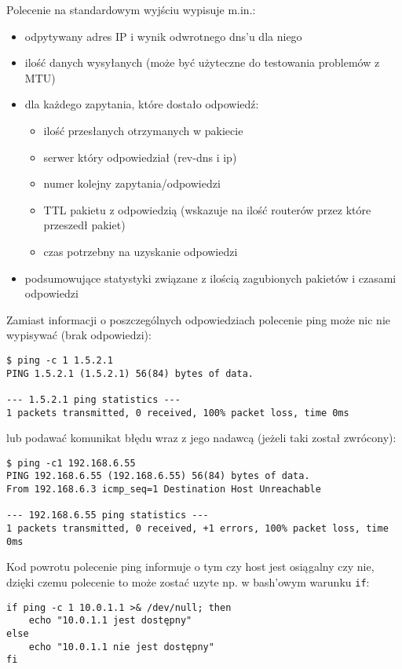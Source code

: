 Polecenie na standardowym wyjściu wypisuje m.in.:
\begin{itemize}
	\item odpytywany adres IP i wynik odwrotnego dns'u dla niego
	\item ilość danych wysyłanych (może być użyteczne do testowania problemów z MTU)
	\item dla każdego zapytania, które dostało odpowiedź:
	\begin{itemize}
		\item ilość przesłanych otrzymanych w pakiecie
		\item serwer który odpowiedział (rev-dns i ip)
		\item numer kolejny zapytania/odpowiedzi
		\item TTL pakietu z odpowiedzią (wskazuje na ilość routerów przez które przeszedł pakiet)
		\item czas potrzebny na uzyskanie odpowiedzi
	\end{itemize}
	\item podsumowujące statystyki związane z ilością zagubionych pakietów i czasami odpowiedzi
\end{itemize}

Zamiast informacji o poszczególnych odpowiedziach polecenie ping może nic nie wypisywać (brak odpowiedzi):
\begin{Verbatim}
$ ping -c 1 1.5.2.1
PING 1.5.2.1 (1.5.2.1) 56(84) bytes of data.

--- 1.5.2.1 ping statistics ---
1 packets transmitted, 0 received, 100% packet loss, time 0ms
\end{Verbatim}
lub podawać komunikat błędu wraz z jego nadawcą (jeżeli taki został zwrócony):
\begin{Verbatim}
$ ping -c1 192.168.6.55
PING 192.168.6.55 (192.168.6.55) 56(84) bytes of data.
From 192.168.6.3 icmp_seq=1 Destination Host Unreachable

--- 192.168.6.55 ping statistics ---
1 packets transmitted, 0 received, +1 errors, 100% packet loss, time 0ms
\end{Verbatim}

Kod powrotu polecenie ping informuje o tym czy host jest osiągalny czy nie, dzięki czemu polecenie to może zostać uzyte np. w bash'owym warunku \Verb#if#:
\begin{Verbatim}
if ping -c 1 10.0.1.1 >& /dev/null; then
	echo "10.0.1.1 jest dostępny"
else
	echo "10.0.1.1 nie jest dostępny"
fi
\end{Verbatim}
\fi


